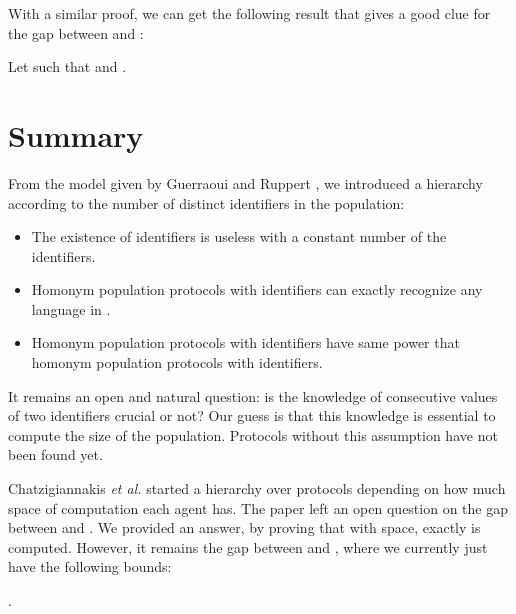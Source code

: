 \documentclass[UKenglish]{llncs}
\begin{document}
With a similar proof, we can get the following result that gives a good clue for the gap
between  and :

\begin{corollary}
Let  such that  and .



\end{corollary}

\section{Summary} \label{sec:5}

From the model given  by Guerraoui and Ruppert \cite{guerraoui2009names}, we introduced a hierarchy according
to the number of distinct identifiers in the population:
\begin{itemize}
\item  The existence of identifiers is useless with a constant number of the identifiers.
\item Homonym population protocols with  identifiers
  can exactly  recognize any language in .
\item Homonym population protocols with  identifiers
  have same power that homonym population protocols
  with  identifiers.
\end{itemize}

It remains an open and natural question: is the knowledge of consecutive values of two identifiers
 crucial or not?  Our guess is that this knowledge  is essential to compute  
the size of the population. Protocols without this assumption have not been found yet.

Chatzigiannakis \emph{et al.}  \cite{chatzigiannakis2011passively} started a hierarchy over protocols
depending on how much space of computation each agent has.
The paper left an open question on the gap between  and .
We provided an answer, by proving that with  space,
exactly  is computed. However, it remains the gap between  and , where we 
currently just have the following bounds: 

.
\end{document}
